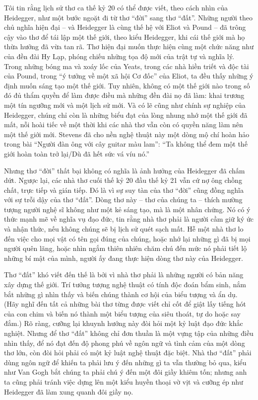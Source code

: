 \documentclass[../main.tex]{subfiles}
\begin{document}
\begin{multicols}{2}
Tôi tin rằng lịch sử thơ ca thế kỷ 20 có thể được viết, theo cách nhìn của Heidegger, như một bước ngoặt đi từ thơ “đời” sang thơ “đất”. Những người theo chủ nghĩa hiện đại – và Heidegger là cùng thế hệ với Eliot và Pound – đã trông cậy vào thơ để tái lập một thế giới, theo kiểu Heidegger, khi cái thế giới mà họ thừa hưởng đã vừa tan rã. Thơ hiện đại muốn thực hiện cùng một chức năng như của đền đài Hy Lạp, phóng chiếu những tọa độ mới của trật tự và nghĩa lý. Trong những bóng ma và xoáy lốc của Yeats, trong các nhà hiền triết và độc tài của Pound, trong “ý tưởng về một xã hội Cơ đốc” của Eliot, ta đều thấy những ý định muốn sáng tạo một thế giới. Tuy nhiên, không có một thế giới nào trong số đó đủ thẩm quyền để làm được điều mà những đền đài nọ đã làm: khai trương một tín ngưỡng mới và một lịch sử mới. Và có lẽ cũng như chính sự nghiệp của Heidegger, chúng chỉ còn là những biểu đạt của lòng nhung nhớ một thế giới đã mất, nỗi hoài tiếc về một thời khi các nhà thơ vẫn còn có quyền năng làm nên một thế giới mới. Stevens đã cho nền nghệ thuật này một dòng mộ chí hoàn hảo trong bài “Người đàn ông với cây guitar màu lam”: “Ta không thể đem một thế giới hoàn toàn trở lại/Dù đã hết sức vá víu nó.” 

Nhưng thơ “đời” thất bại không có nghĩa là ảnh hưởng của Heidegger đã chấm dứt. Ngược lại, các nhà thơ cuối thế kỷ 20 đầu thế kỷ 21 vẫn cứ nợ ông chồng chất, trực tiếp và gián tiếp. Đó là vì sự suy tàn của thơ “đời” cũng đồng nghĩa với sự trỗi dậy của thơ “đất”. Dòng thơ này – thơ của chúng ta – thích mường tượng người nghệ sĩ không như một kẻ sáng tạo, mà là một nhân chứng. Nó có ý thức mạnh mẽ về nghĩa vụ đạo đức, tin rằng nhà thơ phải là người cầm giữ ký ức và nhận thức, nếu không chúng sẽ bị lịch sử quét sạch mất. Hễ một nhà thơ lo đến việc cho mọi vật có tên gọi đúng của chúng, hoặc nhớ lại những gì đã bị mọi người quên lãng, hoặc nhìn ngắm thiên nhiên chăm chú đến mức nó phải tiết lộ những bí mật của mình, người ấy đang thực hiện dòng thơ này của Heidegger. 

Thơ “đất” khó viết đến thế là bởi vì nhà thơ phải là những người có bản năng xây dựng thế giới. Trí tưởng tượng nghệ thuật có tính độc đoán bẩm sinh, nắm bắt những gì nhìn thấy và biến chúng thành cơ hội của biểu tượng và ẩn dụ. (Hãy nghĩ đến tất cả những bài thơ từng được viết chỉ cốt để giật lấy tiếng hót của con chim và biến nó thành một biểu tượng của siêu thoát, tự do hoặc say đắm.) Rõ ràng, cưỡng lại khuynh hướng này đòi hỏi một kỷ luật đạo đức khắc nghiệt. Nhưng để thơ “đất” không chỉ đơn thuần là một vựng tập của những điều nhìn thấy, để nó đạt đến độ phong phú về ngôn ngữ và tình cảm của một dòng thơ lớn, còn đòi hỏi phải có một kỷ luật nghệ thuật đặc biệt. Nhà thơ “đất” phải dùng ngôn ngữ để khiến ta phải lưu ý đến những gì ta vẫn thường bỏ qua, kiểu như Van Gogh bắt chúng ta phải chú ý đến một đôi giầy khiêm tốn; nhưng anh ta cũng phải tránh việc dựng lên một kiểu huyền thoại vờ vịt và cưỡng ép như Heidegger đã làm xung quanh đôi giầy nọ. 


\end{multicols}
\end{document}
